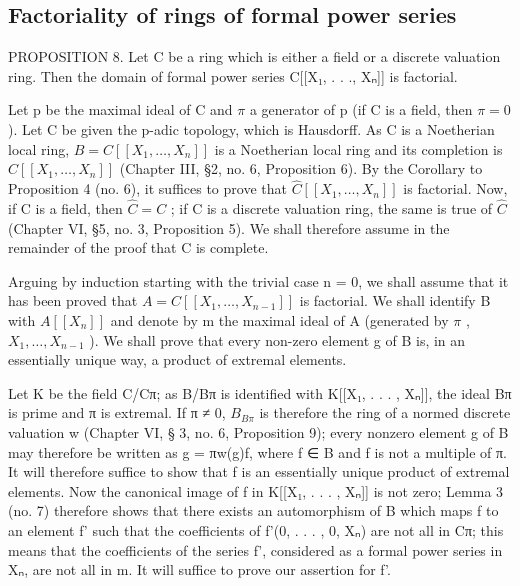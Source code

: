 \subsection{Factoriality of rings of formal power series}

PROPOSITION 8. Let C be a ring which is either a field or a discrete valuation ring. Then the domain of formal power series C{[}{[}X₁, . . ., Xₙ{]}{]} is factorial.

Let p be the maximal ideal of C and \(\pi\) a generator of p (if C is a field, then \(\pi = 0\) ). Let C be given the p-adic topology, which is Hausdorff. As C is a Noetherian local ring, \(B = C[[X_{1}, \ldots, X_{n}]]\) is a Noetherian local ring and its completion is \(\hat{C}[[X_{1}, \ldots, X_{n}]]\) (Chapter III, §2, no. 6, Proposition 6). By the Corollary to Proposition 4 (no. 6), it suffices to prove that \(\hat{C}[[X_{1}, \ldots, X_{n}]]\) is factorial. Now, if C is a field, then \(\hat{C} = C\) ; if C is a discrete valuation ring, the same is true of \(\hat{C}\) (Chapter VI, §5, no. 3, Proposition 5). We shall therefore assume in the remainder of the proof that C is complete.

Arguing by induction starting with the trivial case n = 0, we shall assume that it has been proved that \(A = C[[X_{1}, \ldots, X_{n-1}]]\) is factorial. We shall identify B with \(A[[X_{n}]]\) and denote by m the maximal ideal of A (generated by \(\pi\) , \(X_{1}, \ldots, X_{n-1}\) ). We shall prove that every non-zero element g of B is, in an essentially unique way, a product of extremal elements.

Let K be the field C/Cπ; as B/Bπ is identified with K{[}{[}X₁, . . . , Xₙ{]}{]}, the ideal Bπ is prime and π is extremal. If π ≠ 0, \(B_{B\pi}\) is therefore the ring of a normed discrete valuation w (Chapter VI, § 3, no. 6, Proposition 9); every nonzero element g of B may therefore be written as g = πw(g)f, where f ∈ B and f is not a multiple of π. It will therefore suffice to show that f is an essentially unique product of extremal elements. Now the canonical image of f in K{[}{[}X₁, . . . , Xₙ{]}{]} is not zero; Lemma 3 (no. 7) therefore shows that there exists an automorphism of B which maps f to an element f' such that the coefficients of f'(0, . . . , 0, Xₙ) are not all in Cπ; this means that the coefficients of the series f', considered as a formal power series in Xₙ, are not all in m. It will suffice to prove our assertion for f'.

